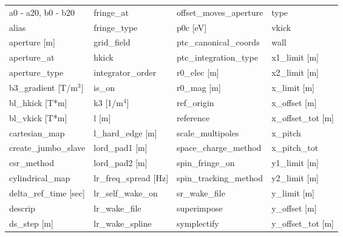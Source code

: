  \begin{tabular}{llll} \toprule
a0 - a20, b0 - b20             & fringe_at                      & offset_moves_aperture          & type                           \\
alias                          & fringe_type                    & p0c [eV]                       & vkick                          \\
aperture [m]                   & grid_field                     & ptc_canonical_coords           & wall                           \\
aperture_at                    & hkick                          & ptc_integration_type           & x1_limit [m]                   \\
aperture_type                  & integrator_order               & r0_elec [m]                    & x2_limit [m]                   \\
b3_gradient [T/m$^3$]          & is_on                          & r0_mag [m]                     & x_limit [m]                    \\
bl_hkick [T*m]                 & k3 [1/m$^4$]                   & ref_origin                     & x_offset [m]                   \\
bl_vkick [T*m]                 & l [m]                          & reference                      & x_offset_tot [m]               \\
cartesian_map                  & l_hard_edge [m]                & scale_multipoles               & x_pitch                        \\
create_jumbo_slave             & lord_pad1 [m]                  & space_charge_method            & x_pitch_tot                    \\
csr_method                     & lord_pad2 [m]                  & spin_fringe_on                 & y1_limit [m]                   \\
cylindrical_map                & lr_freq_spread [Hz]            & spin_tracking_method           & y2_limit [m]                   \\
delta_ref_time [sec]           & lr_self_wake_on                & sr_wake_file                   & y_limit [m]                    \\
descrip                        & lr_wake_file                   & superimpose                    & y_offset [m]                   \\
ds_step [m]                    & lr_wake_spline                 & symplectify                    & y_offset_tot [m]               \\

\end{tabular}
